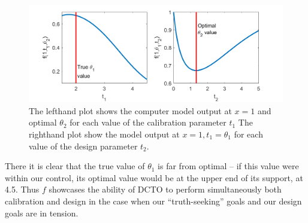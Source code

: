 \documentclass[12pt]{article}
\begin{document}
\begin{figure}
\centering
\includegraphics[scale=0.85]{FIG_true_optimal_theta1_theta2}
 	\captionsetup{width=.85\linewidth}
\caption{The lefthand plot shows the computer model output at $x=1$ and optimal $\theta_2$ for each value of the calibration parameter $t_1$ The righthand plot show the model output at $x=1,t_1=\theta_1$ for each value of the design parameter $t_2$.}
\label{fig:true_vals}
\end{figure}
%
There it is clear that the true value of $\theta_1$ is far from optimal -- if this value were within our control, its optimal value would be at the upper end of its support, at 4.5.
%
Thus $f$ showcases the ability of DCTO to perform simultaneously both calibration and design in the case when our ``truth-seeking'' goals and our design goals are in tension.
%

%
\end{document}
